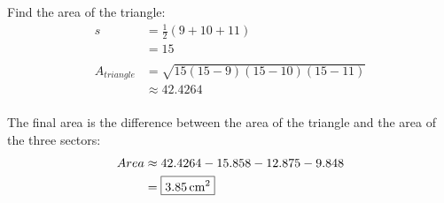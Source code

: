 \documentclass{exam}
\begin{document}
\begin{description}
        Find the area of the triangle:
        \begin{align*}
          s  & = \frac{1}{2}(9 + 10 + 11) \\
             & = 15 \\
          \\
          A_{triangle} & = \sqrt{15 (15 - 9)(15 - 10) (15 - 11)} \\
                       & \approx 42.4264 \\
        \end{align*}

        The final area is the difference between the area of the triangle and the area of the three sectors:
        \begin{align*}
          Area & \approx 42.4264 - 15.858 - 12.875 - 9.848 \\
               & = \boxed{ \unit[3.85]{cm^2} } \\
        \end{align*}

    \end{description}

\end{document}
